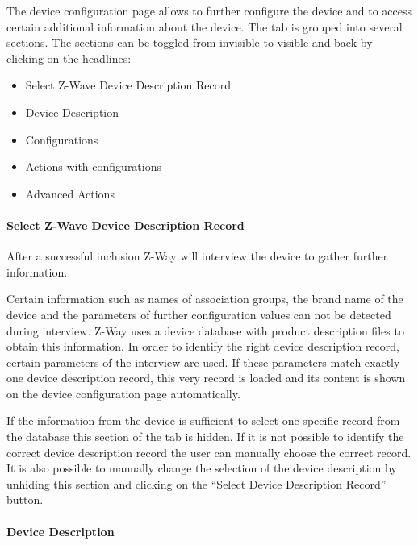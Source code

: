 The device configuration page allows to further configure the device and to access certain additional 
information about the device. The tab is grouped into several sections. The sections can be toggled 
from invisible to visible and back by clicking on the headlines:
\begin{itemize}
\item Select Z-Wave Device Description Record
\item Device Description
\item Configurations
\item Actions with configurations
\item Advanced Actions
\end{itemize}

\paragraph{Select Z-Wave Device Description Record}

After a successful inclusion Z-Way will interview the device to gather further information.  

Certain information such as names of association groups, the brand name of the device and the parameters of further configuration values can not be detected during interview. 
Z-Way uses a device database with product description files to obtain this information. In order to identify the right device description record, certain parameters of the interview are used. 
If these parameters match exactly one device description record, this very record is loaded and its content is shown on the device configuration page automatically.

If the information from the device is sufficient to select one specific record from the database this section of the tab is hidden. 
If it is not possible to identify the correct device description record the user can manually choose the correct record. It is also possible to manually 
change the selection of the device description by unhiding this section and clicking on the “Select Device Description Record” button.

\paragraph{Device Description}


